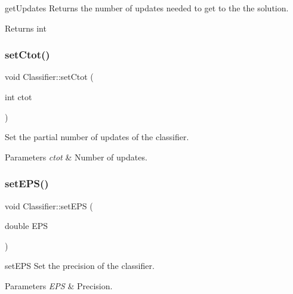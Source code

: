 get\+Updates Returns the number of updates needed to get to the the solution. 

\begin{DoxyReturn}{Returns}
int 
\end{DoxyReturn}
\mbox{\label{class_classifier_a3293d7d39c3934503a23b920f84f73e7}} 
\subsubsection{\texorpdfstring{set\+Ctot()}{setCtot()}}
{\footnotesize\ttfamily void Classifier\+::set\+Ctot (\begin{DoxyParamCaption}\item[{int}]{ctot }\end{DoxyParamCaption})}



Set the partial number of updates of the classifier. 


\begin{DoxyParams}{Parameters}
{\em ctot} & Number of updates. \\
\hline
\end{DoxyParams}
\mbox{\label{class_classifier_a9cc5a1d92243f9d9b530347be1ac7367}} 
\subsubsection{\texorpdfstring{set\+E\+P\+S()}{setEPS()}}
{\footnotesize\ttfamily void Classifier\+::set\+E\+PS (\begin{DoxyParamCaption}\item[{double}]{E\+PS }\end{DoxyParamCaption})}



set\+E\+PS Set the precision of the classifier. 


\begin{DoxyParams}{Parameters}
{\em E\+PS} & Precision. \\
\hline
\end{DoxyParams}
\mbox{\label{class_classifier_a8f6818bd403afbb46d1bfd75c9731ab6}} 

